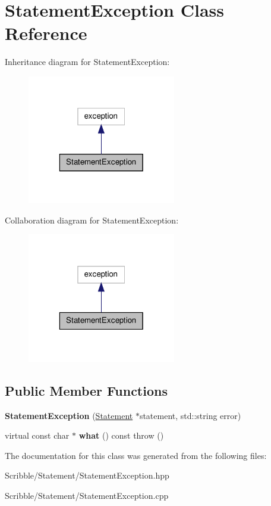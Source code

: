 \hypertarget{class_statement_exception}{\section{Statement\-Exception Class Reference}
\label{class_statement_exception}
}


Inheritance diagram for Statement\-Exception\-:
\nopagebreak
\begin{figure}[H]
\begin{center}
\leavevmode
\includegraphics[width=184pt]{class_statement_exception__inherit__graph}
\end{center}
\end{figure}


Collaboration diagram for Statement\-Exception\-:
\nopagebreak
\begin{figure}[H]
\begin{center}
\leavevmode
\includegraphics[width=184pt]{class_statement_exception__coll__graph}
\end{center}
\end{figure}
\subsection*{Public Member Functions}
\begin{DoxyCompactItemize}
\item 
\hypertarget{class_statement_exception_a82ce4f88b1a41cf215be837956dc784e}{{\bfseries Statement\-Exception} (\hyperlink{class_statement}{Statement} $\ast$statement, std\-::string error)}\label{class_statement_exception_a82ce4f88b1a41cf215be837956dc784e}

\item 
\hypertarget{class_statement_exception_a938da227432fa7ca7e43e9c59814f986}{virtual const char $\ast$ {\bfseries what} () const   throw ()}\label{class_statement_exception_a938da227432fa7ca7e43e9c59814f986}

\end{DoxyCompactItemize}


The documentation for this class was generated from the following files\-:\begin{DoxyCompactItemize}
\item 
Scribble/\-Statement/Statement\-Exception.\-hpp\item 
Scribble/\-Statement/Statement\-Exception.\-cpp\end{DoxyCompactItemize}
